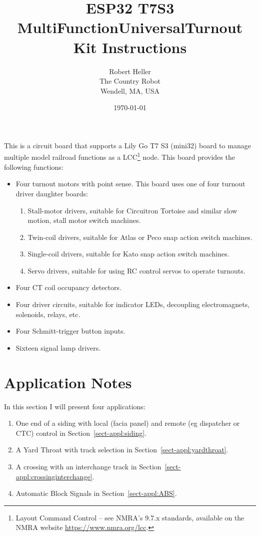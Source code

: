 \documentclass[12pt,twoside]{article}
\title{ESP32 T7S3 MultiFunctionUniversalTurnout Kit Instructions}
\author{Robert Heller \\ The Country Robot \\ Wendell, MA, USA}
\date{\today}
\begin{document}
\maketitle

This is a circuit board that supports a Lily Go T7 S3 (mini32) board to manage
multiple model railroad functions as a LCC\footnote{Layout Command Control --
see NMRA's 9.7.x standards, available on the NMRA website
\url{https://www.nmra.org/lcc}.} node. This board provides the following 
functions:

\begin{itemize}
\item Four turnout motors with point sense.  This board uses one of four 
turnout driver daughter boards:
\begin{enumerate}
\item Stall-motor drivers, suitable for Circuitron Tortoise and similar slow 
motion, stall motor switch machines.
\item Twin-coil drivers, suitable for Atlas or Peco snap action switch 
machines.
\item Single-coil drivers, suitable for Kato snap action switch machines.
\item Servo drivers, suitable for using RC control servos to operate turnouts.
\end{enumerate}
\item Four CT coil occupancy detectors.
\item Four driver circuits, suitable for indicator LEDs, decoupling 
electromagnets, solenoids, relays, etc.
\item Four Schmitt-trigger button inputs.
\item Sixteen signal lamp drivers.
\end{itemize}

\clearpage



\section{Application Notes}

In this section I will present four applications:

\begin{enumerate}
\item One end of a siding with local (facia panel) and remote (eg dispatcher
or CTC) control in Section~\ref{sect-appl:siding}.
\item A Yard Throat with track selection in 
Section~\ref{sect-appl:yardthroat}. 
\item A crossing with an interchange track in 
Section~\ref{sect-appl:crossinginterchange}.
\item Automatic Block Signals in Section~\ref{sect-appl:ABS}.
\end{enumerate}





\end{document}
